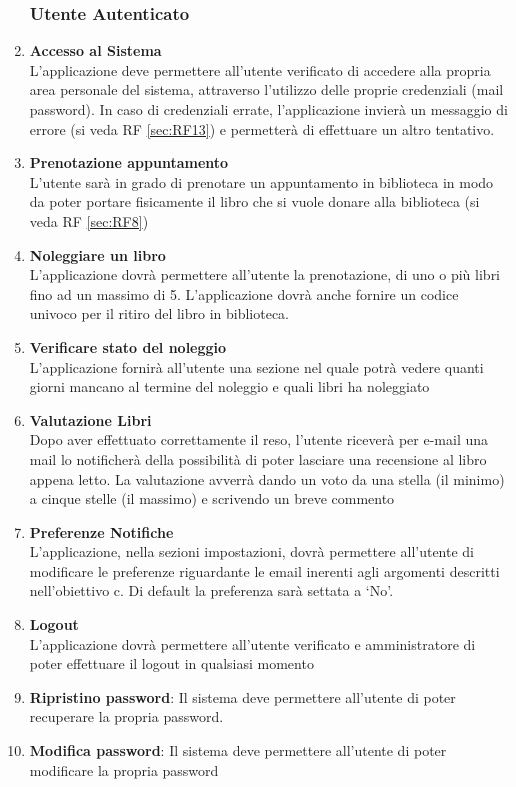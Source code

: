\documentclass{article}
\begin{document}
\begin{enumerate}
    \subsubsection{Utente Autenticato}
        \item \textbf{Accesso al Sistema}\label{sec:RF3}\\
        L’applicazione deve permettere all’utente verificato di accedere alla propria area personale del sistema, attraverso l’utilizzo delle proprie credenziali (mail password). In caso di credenziali errate, l’applicazione invierà un messaggio di errore (si veda RF \ref{sec:RF13}) e permetterà di effettuare un altro tentativo.
        \item \textbf{Prenotazione appuntamento}\label{sec:RF4}\\
        L’utente sarà in grado di prenotare un appuntamento in biblioteca in modo da poter portare fisicamente il libro che si vuole donare alla biblioteca (si veda RF \ref{sec:RF8})
        \item \textbf{Noleggiare un libro}\label{sec:RF5}\\
        L’applicazione dovrà permettere all’utente la prenotazione, di uno o più libri fino ad un massimo di 5. L’applicazione dovrà anche fornire un codice univoco per il ritiro del libro in biblioteca.
        \item \textbf{Verificare stato del noleggio}\label{sec:RF6}\\
        L’applicazione fornirà all’utente una sezione nel quale potrà vedere quanti giorni mancano al termine del noleggio e quali libri ha noleggiato
        \item \textbf{Valutazione Libri}\label{sec:RF7}\\
        Dopo aver effettuato correttamente il reso, l’utente riceverà per e-mail una mail lo notificherà della possibilità di poter lasciare una recensione al libro appena letto. La valutazione avverrà dando un voto da una stella (il minimo) a cinque stelle (il massimo) e scrivendo un breve commento
        \item \textbf{Preferenze Notifiche}\label{sec:RF8}\\
        L’applicazione, nella sezioni impostazioni, dovrà permettere all’utente di modificare le preferenze riguardante le email inerenti agli argomenti descritti nell’obiettivo c. Di default la preferenza sarà settata a ‘No’.
        \item \textbf{Logout}\label{sec:RF9}\\
        L’applicazione dovrà permettere all’utente verificato e amministratore di poter effettuare il logout in qualsiasi momento
        \item  \textbf{Ripristino password}: Il sistema deve permettere all'utente di poter recuperare la propria password.
        \item  \textbf{Modifica password}: Il sistema deve permettere all'utente di poter modificare la propria password

\end{enumerate}
\end{document}
